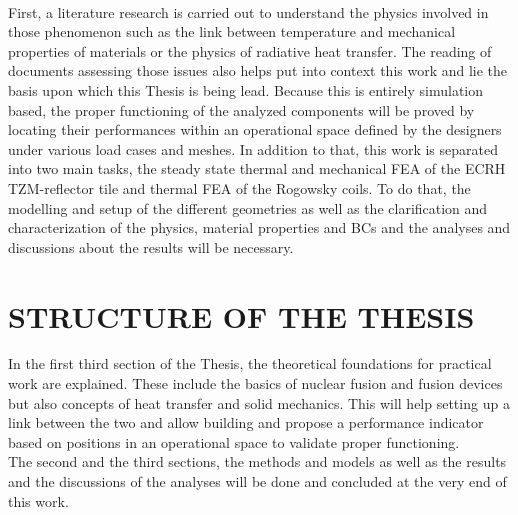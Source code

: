 \\
\break
\normalsize{\indent First, a literature research is carried out to understand the physics involved in those phenomenon such as the link between temperature and mechanical properties of materials or the physics of radiative heat transfer. The reading of documents assessing those issues also helps put into context this work and lie the basis upon which this Thesis is being lead. Because this is entirely simulation based, the proper functioning of the analyzed components will be proved by locating their performances within an operational space defined by the designers under various load cases and meshes. In addition to that, this work is separated into two main tasks, the steady state thermal and mechanical FEA of the \acrshort{ECRH} TZM-reflector tile and thermal FEA of the Rogowsky coils. To do that, the modelling and setup of the different geometries as well as the clarification and characterization of the physics, material properties and \acrshort{BCs} and the analyses and discussions about the results will be necessary.}

\section{STRUCTURE OF THE THESIS}
\normalsize{In the first third section of the Thesis, the theoretical foundations for practical work are explained. These include the basics of nuclear fusion and fusion devices but also concepts of heat transfer and solid mechanics. This will help setting up a link between the two and allow building and propose a performance indicator based on positions in an operational space to validate proper functioning.}
\\
\break
\normalsize{\indent The second and the third sections, the methods and models as well as the results and the discussions of the analyses will be done and concluded at the very end of this work.}
